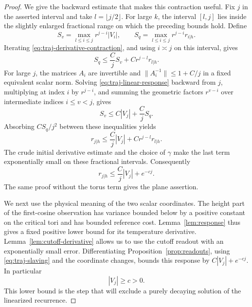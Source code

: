 \begin{proof}
We give the backward estimate that makes this contraction useful.
Fix \(j\) in the asserted interval and take
\(l=\lfloor j/2\rfloor\).  For large \(k\), the interval
\([l,j]\) lies inside the slightly enlarged fractional range on
which the preceding bounds hold.  Define
\[
 S_v=\max_{l\le i\le j}r^{j-i}|V_i|,
 \qquad
 S_q=\max_{l\le i\le j}r^{j-i}r_{i|h}.
\]
Iterating \eqref{eq:traj-derivative-contraction}, and using
\(i\asymp j\) on this interval, gives
\begin{equation}\label{eq:traj-weighted-forward}
 S_q\le\frac CjS_v+Cr^{j-l}r_{l|h}.
\end{equation}
For large \(j\), the matrices \(A_i\) are invertible and
\(\|A_i^{-1}\|\le1+C/j\) in a fixed equivalent scalar norm.
Solving \eqref{eq:traj-linear-response} backward from \(j\),
multiplying at index \(i\) by \(r^{j-i}\), and summing the
geometric factors \(r^{v-i}\) over intermediate indices
\(i\le v<j\), gives
\begin{equation}\label{eq:traj-weighted-backward}
 S_v\le C|V_j|+\frac CjS_q.
\end{equation}
Absorbing \(CS_q/j^2\) between these inequalities yields
\[
 r_{j|h}\le\frac Cj|V_j|+Cr^{j-l}r_{l|h}.
\]
The crude initial derivative estimate and the choice of \(\gamma\)
make the last term exponentially small on these fractional
intervals.  Consequently
\begin{equation}\label{eq:traj-slaving}
 r_{j|h}\le\frac Cj|V_j|+e^{-cj}.
\end{equation}
The same proof without the torus term gives the plane assertion.

We next use the physical meaning of the two scalar coordinates.
The height part of the first-cosine observation has variance bounded
below by a positive constant on the critical tori and has bounded
reference cost.  Lemma~\ref{lem:response} thus gives a fixed positive
lower bound for its temperature derivative.  Lemma~\ref{lem:cutoff-derivative}
allows us to use the cutoff readout with an exponentially small
error.  Differentiating Proposition~\ref{prop:readouts}, using
\eqref{eq:traj-slaving} and the coordinate changes, bounds this
response by \(C|V_j|+e^{-cj}\).  In particular
\begin{equation}\label{eq:traj-response-nonvanishing}
                         |V_j|\ge c>0.
\end{equation}
This lower bound is the step that will exclude a purely decaying
solution of the linearized recurrence.


\end{proof}
